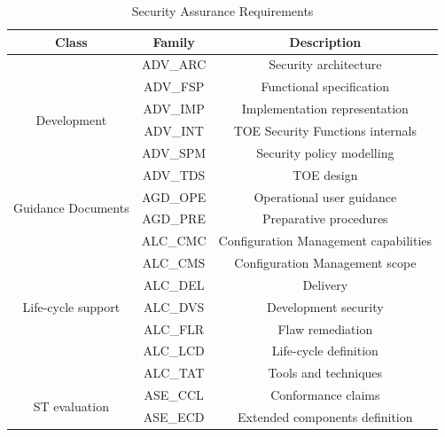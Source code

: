 \begin{table}[]
\centering
\caption{Security Assurance Requirements}
\label{tab:SAR}
\begin{tabular}{ccc}
\toprule
Class                               & Family   & Description                           \\
\midrule
\multirow{6}{*}{Development}        & ADV\_ARC & Security architecture                 \\
                                    & ADV\_FSP & Functional specification              \\
                                    & ADV\_IMP & Implementation representation         \\
                                    & ADV\_INT & TOE Security Functions internals      \\
                                    & ADV\_SPM & Security policy modelling             \\
                                    & ADV\_TDS & TOE design                            \\
                                    \midrule
\multirow{2}{*}{Guidance Documents} & AGD\_OPE & Operational user guidance             \\
                                    & AGD\_PRE & Preparative procedures                \\
                                    \midrule
\multirow{7}{*}{Life-cycle support} & ALC\_CMC & Configuration Management capabilities \\
                                    & ALC\_CMS & Configuration Management scope        \\
                                    & ALC\_DEL & Delivery                              \\
                                    & ALC\_DVS & Development security                  \\
                                    & ALC\_FLR & Flaw remediation                      \\
                                    & ALC\_LCD & Life-cycle definition                 \\
                                    & ALC\_TAT & Tools and techniques                  \\
                                    \midrule
\multirow{7}{*}{ST evaluation}      & ASE\_CCL & Conformance claims                    \\
                                    & ASE\_ECD & Extended components definition        \\

\end{tabular}
\end{table}
